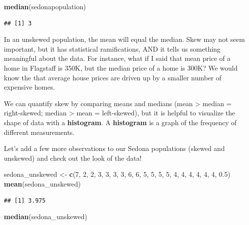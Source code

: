 \documentclass[
]{book}
\newenvironment{Shaded}{\begin{snugshade}}{\end{snugshade}}
\newcommand{\DecValTok}[1]{\textcolor[rgb]{0.00,0.00,0.81}{#1}}
\newcommand{\FloatTok}[1]{\textcolor[rgb]{0.00,0.00,0.81}{#1}}
\newcommand{\FunctionTok}[1]{\textcolor[rgb]{0.13,0.29,0.53}{\textbf{#1}}}
\newcommand{\NormalTok}[1]{#1}
\newcommand{\OtherTok}[1]{\textcolor[rgb]{0.56,0.35,0.01}{#1}}
\begin{document}
\begin{Shaded}
\begin{Highlighting}[]
\FunctionTok{median}\NormalTok{(sedonapopulation)}
\end{Highlighting}
\end{Shaded}

\begin{verbatim}
## [1] 3
\end{verbatim}

In an unskewed population, the mean will equal the median. Skew may not seem important, but it has statistical ramifications, AND it tells us something meaningful about the data. For instance, what if I said that mean price of a home in Flagstaff is 350K, but the median price of a home is 300K? We would know the that average house prices are driven up by a smaller number of expensive homes.

We can quantify skew by comparing means and medians (mean \textgreater{} median = right-skewed; median \textgreater{} mean = left-skewed), but it is helpful to visualize the shape of data with a \textbf{histogram}. A \textbf{histogram} is a graph of the frequency of different measurements.

Let's add a few more observations to our Sedona populations (skewed and unskewed) and check out the look of the data!

\begin{Shaded}
\begin{Highlighting}[]
\NormalTok{sedona\_unskewed }\OtherTok{\textless{}{-}} \FunctionTok{c}\NormalTok{(}\DecValTok{7}\NormalTok{, }\DecValTok{2}\NormalTok{, }\DecValTok{2}\NormalTok{, }\DecValTok{3}\NormalTok{, }\DecValTok{3}\NormalTok{, }\DecValTok{3}\NormalTok{, }\DecValTok{3}\NormalTok{, }\DecValTok{6}\NormalTok{, }\DecValTok{6}\NormalTok{, }\DecValTok{5}\NormalTok{, }\DecValTok{5}\NormalTok{, }\DecValTok{5}\NormalTok{, }\DecValTok{5}\NormalTok{, }\DecValTok{4}\NormalTok{, }\DecValTok{4}\NormalTok{, }\DecValTok{4}\NormalTok{, }\DecValTok{4}\NormalTok{, }\DecValTok{4}\NormalTok{, }\DecValTok{4}\NormalTok{, }\FloatTok{0.5}\NormalTok{)}
\FunctionTok{mean}\NormalTok{(sedona\_unskewed)}
\end{Highlighting}
\end{Shaded}

\begin{verbatim}
## [1] 3.975
\end{verbatim}

\begin{Shaded}
\begin{Highlighting}[]
\FunctionTok{median}\NormalTok{(sedona\_unskewed)}
\end{Highlighting}
\end{Shaded}
\end{document}
